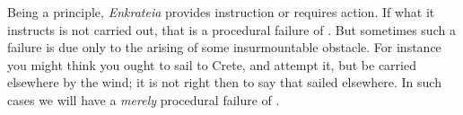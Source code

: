 \documentclass[11pt,letterpaper,oneside]{amsart}
\begin{document}

















Being a principle, \emph{Enkrateia} provides instruction or requires action. If what it instructs is not carried out, that is a procedural failure of \enk. But sometimes such a failure is due only to the arising of some insurmountable obstacle. For instance you might think you ought to sail to Crete, and attempt it, but be carried elsewhere by the wind; it is not right then to say that  sailed elsewhere. In such cases we will have a \emph{merely} procedural failure of \enk.
\end{document}
